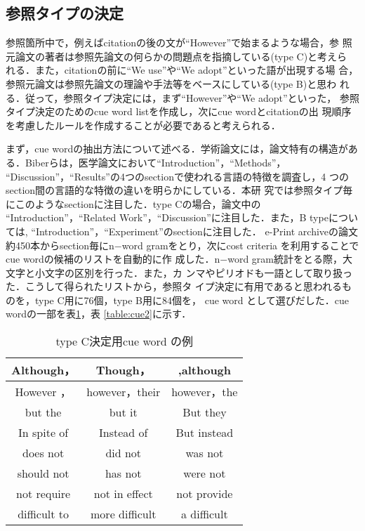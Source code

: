 \subsection{参照タイプの決定}

参照箇所中で，例えばcitationの後の文が``However''で始まるような場合，参
照元論文の著者は参照先論文の何らかの問題点を指摘している(type C)と考えら
れる．また，citationの前に``We use''や``We adopt''といった語が出現する場
合，参照元論文は参照先論文の理論や手法等をベースにしている(type B)と思わ
れる．従って，参照タイプ決定には，まず``However''や``We adopt''といった，
参照タイプ決定のためのcue word listを作成し，次にcue wordとcitationの出
現順序を考慮したルールを作成することが必要であると考えられる．

まず，cue wordの抽出方法について述べる．学術論文には，論文特有の構造があ
る．Biberらは，医学論文において``Introduction''，``Methods''，
``Discussion''，``Results''の4つのsectionで使われる言語の特徴を調査し，4
つのsection間の言語的な特徴の違いを明らかにしている\cite{Biber94}．本研
究では参照タイプ毎にこのようなsectionに注目した．type Cの場合，論文中の
``Introduction''，``Related Work''，``Discussion''に注目した．また，B
typeについては, ``Introduction''，``Experiment''のsectionに注目した．
e-Print archiveの論文約450本からsection毎にn$-$word gramをとり，次にcost
criteria \cite{Kita94}を利用することでcue wordの候補のリストを自動的に作
成した．n$-$word gram統計をとる際，大文字と小文字の区別を行った．また，カ
ンマやピリオドも一語として取り扱った．こうして得られたリストから，参照タ
イプ決定に有用であると思われるものを，type C用に76個，type B用に84個を，
cue word として選びだした．cue wordの一部を表\ref{table:cue1}，表
\ref{table:cue2}に示す．

\begin{table}[t]
\caption{type C決定用cue word の例\label{table:cue1}}
\begin{center}
\begin{tabular}{|c|c|c|}\hline
 Although，& Though，& ,although \\ \hline
 However ，& however，their & however，the \\ \hline
 but the & but it & But they \\ \hline
 In spite of & Instead of & But instead \\ \hline
 does not & did not & was not \\ \hline
 should not & has not & were not \\ \hline
 not require & not in effect & not provide \\ \hline
 difficult to & more difficult & a difficult \\ \hline
\end{tabular}
\end{center}
\end{table}

